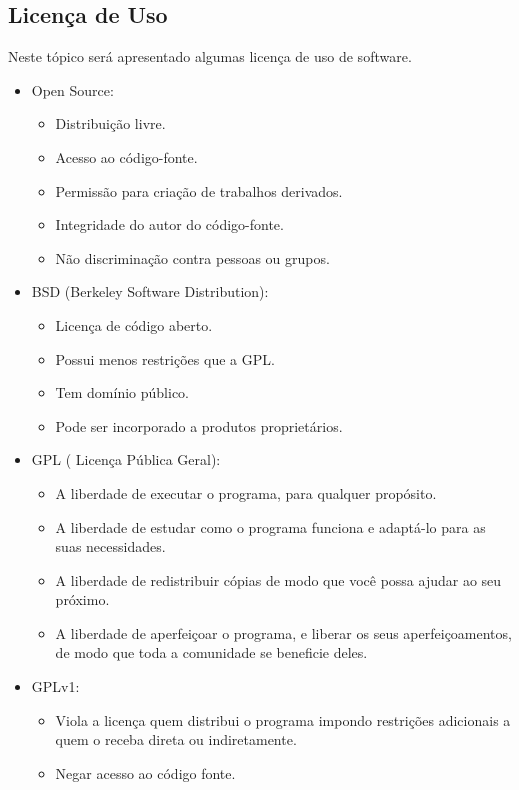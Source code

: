 \documentclass[12pt,a4paper]{article}
\begin{document}
\subsection {Licença de Uso}

Neste tópico será apresentado algumas licença de uso de software.

\begin{itemize}
\item Open Source:
\begin{itemize}
\item Distribuição livre.
\item Acesso ao código-fonte.
\item Permissão para criação de trabalhos derivados.
\item Integridade do autor do código-fonte.
\item Não discriminação contra pessoas ou grupos.
\end{itemize}

\item BSD (Berkeley Software Distribution):
\begin{itemize}
\item Licença de código aberto.
\item Possui menos restrições que a GPL.
\item Tem domínio público.
\item Pode ser incorporado a produtos proprietários.
\end{itemize}


\item GPL ( Licença Pública Geral):
\begin{itemize}
\item A liberdade de executar o programa, para qualquer propósito.
\item A liberdade de estudar como o programa funciona e adaptá-lo para as suas necessidades.
\item A liberdade de redistribuir cópias de modo que você possa ajudar ao seu próximo.
\item A liberdade de aperfeiçoar o programa, e liberar os seus aperfeiçoamentos, de modo que toda a comunidade se beneficie deles.
\end{itemize}

\item GPLv1:
\begin{itemize}
\item Viola a licença quem distribui o programa impondo restrições adicionais a quem o receba direta ou indiretamente.
\item Negar acesso ao código fonte.
\end{itemize}


\end{itemize}
\end{document}
